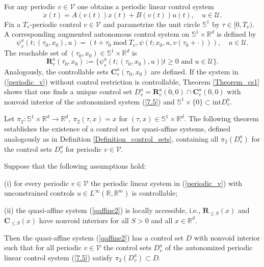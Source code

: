\documentclass{siamltex}%
\begin{document}
For any periodic $v\in\mathcal{V}$ one obtains a periodic linear control
system%
\begin{equation}
\dot{x}(t)=A(v(t))x(t)+B(v(t))u(t),\quad u\in\mathcal{U}. \label{periodic_v}%
\end{equation}
Fix a $T_{v}$-periodic control $v\in\mathcal{V}$ and parametrize the unit
circle $\mathbb{S}^{1}$ by $\tau\in\lbrack0,T_{v})$. A corresponding augmented
autonomous control system on $\mathbb{S}^{1}\times\mathbb{R}^{d}$ is defined
by%
\begin{equation}
\psi_{v}^{a}(t;(\tau_{0},x_{0}),u)=(t+\tau_{0}\operatorname{mod}T_{v}%
,\psi(t;x_{0},u,v(\tau_{0}+\cdot))),\quad u\in\mathcal{U}. \label{7.5}%
\end{equation}
The reachable set of $(\tau_{0},x_{0})\in\mathbb{S}^{1}\times\mathbb{R}^{d}$
is%
\[
\mathbf{R}_{v}^{a}(\tau_{0},x_{0}):=\{\psi_{v}^{a}(t;(\tau_{0},x_{0}%
),u)\left\vert t\geq0\text{ and }u\in\mathcal{U}\right.  \mathcal{\}}.
\]
Analogously, the controllable sets $\mathbf{C}_{v}^{a}(\tau_{0},x_{0})$ are
defined. If the system in (\ref{periodic_v}) without control restriction is
controllable, Theorem \ref{Theorem_cs1} shows that one finds a unique control
set $D_{v}^{a}=\overline{\mathbf{R}_{v}^{a}(0,0)}\cap\mathbf{C}_{v}^{a}(0,0)$
with nonvoid interior of the autonomized system (\ref{7.5}) and $\mathbb{S}%
^{1}\times\{0\}\subset\mathrm{int}D_{v}^{a}$.

Let $\pi_{2}:\mathbb{S}^{1}\times\mathbb{R}^{d}\rightarrow\mathbb{R}^{d}%
,~\pi_{2}(\tau,x)=x$ for $(\tau,x)\in\mathbb{S}^{1}\times\mathbb{R}^{d}$. The
following theorem establishes the existence of a control set for quasi-affine
systems, defined analogously as in Definition \ref{Definition_control_sets},
containing all $\pi_{2}(D_{v}^{a})$ for the control sets $D_{v}^{a}$ for
periodic $v\in\mathcal{V}$.

\begin{theorem}
\label{Theorem7.1}Suppose that the following assumptions hold:

(i) for every periodic $v\in\mathcal{V}$ the periodic linear system in
(\ref{periodic_v}) with unconstrained controls $u\in L^{\infty}(\mathbb{R}%
,\mathbb{R}^{m})$ is controllable;

(ii) the quasi-affine system (\ref{qaffine2}) is locally accessible, i.e.,
$\mathbf{R}_{\leq S}(x)$ and $\mathbf{C}_{\leq S}(x)$ have nonvoid interiors
for all $S>0$ and all $x\in\mathbb{R}^{d}$.

Then the quasi-affine system (\ref{qaffine2}) has a control set $D$ with
nonvoid interior such that for all periodic $v\in\mathcal{V}$ the control sets
$D_{v}^{a}$ of the autonomized periodic linear control system (\ref{7.5})
satisfy $\pi_{2}(D_{v}^{a})\subset D.$
\end{theorem}
\end{document}
